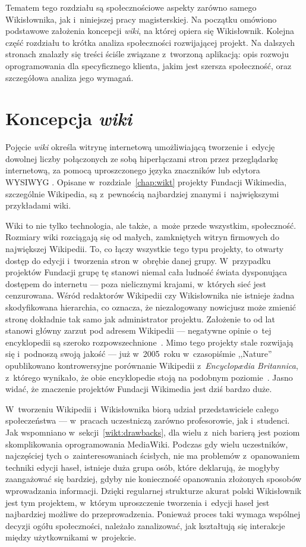 Tematem tego rozdziału są społecznościowe aspekty zarówno samego Wikisłownika, jak i~niniejszej pracy magisterskiej. Na początku omówiono podstawowe założenia koncepcji \emph{wiki}, na której opiera się Wikisłownik. Kolejna część rozdziału to krótka analiza społeczności rozwijającej projekt. Na dalszych stronach znalazły się treści ściśle związane z~tworzoną aplikacją: opis rozwoju oprogramowania dla specyficznego klienta, jakim jest szersza społeczność, oraz szczegółowa analiza jego wymagań.

\section{Koncepcja \emph{wiki}}
Pojęcie \emph{wiki} określa witrynę internetową umożliwiającą tworzenie i~edycję dowolnej liczby połączonych ze sobą hiperłączami stron przez przeglądarkę internetową, za pomocą uproszczonego języka znaczników lub edytora WYSIWYG \cite{britannica}. Opisane w~rozdziale~\ref{chap:wikt} projekty Fundacji Wikimedia, szczególnie Wikipedia, są z~pewnością najbardziej znanymi i~największymi przykładami wiki.

Wiki to nie tylko technologia, ale także, a~może przede wszystkim, społeczność. Rozmiary wiki rozciągają się od małych, zamkniętych witryn firmowych do największej Wikipedii. To, co łączy wszystkie tego typu projekty, to otwarty dostęp do edycji i~tworzenia stron w~obrębie danej grupy. W~przypadku projektów Fundacji grupę tę stanowi niemal cała ludność świata dysponująca dostępem do internetu --- poza nielicznymi krajami, w~których sieć jest cenzurowana. Wśród redaktorów Wikipedii czy Wikisłownika nie istnieje żadna skodyfikowana hierarchia, co oznacza, że niezalogowany nowicjusz może zmienić stronę dokładnie tak samo jak administrator projektu. Założenie to od lat stanowi główny zarzut pod adresem Wikipedii --- negatywne opinie o~tej encyklopedii są szeroko rozpowszechnione~\cite{knol}. Mimo tego projekty stale rozwijają się i~podnoszą swoją jakość --- już w~2005~roku w~czasopiśmie ,,Nature'' opublikowano kontrowersyjne porównanie Wikipedii z~\emph{Encyclopædia Britannica}, z~którego wynikało, że obie encyklopedie stoją na podobnym poziomie~\cite{nature:britannica}. Jasno widać, że znaczenie projektów Fundacji Wikimedia jest dziś bardzo duże.

W~tworzeniu Wikipedii i~Wikisłownika biorą udział przedstawiciele całego społeczeństwa --- w~pracach uczestniczą zarówno profesorowie, jak i~studenci. Jak wspomniano w~sekcji~\ref{wikt:drawbacks}, dla wielu z~nich barierą jest poziom skomplikowania oprogramowania MediaWiki. Podczas gdy wielu uczestników, najczęściej tych o~zainteresowaniach ścisłych, nie ma problemów z~opanowaniem techniki edycji haseł, istnieje duża grupa osób, które deklarują, że mogłyby zaangażować się bardziej, gdyby nie konieczność opanowania złożonych sposobów wprowadzania informacji. Dzięki regularnej strukturze akurat polski Wikisłownik jest tym projektem, w~którym uproszczenie tworzenia i~edycji haseł jest najbardziej możliwe do przeprowadzenia. Ponieważ proces taki wymaga wspólnej decyzji ogółu społeczności, należało zanalizować, jak kształtują się interakcje między użytkownikami w~projekcie.

